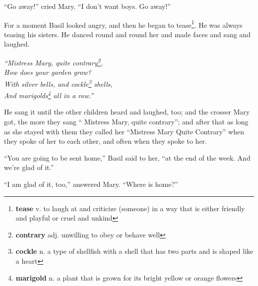 ``Go away!'' cried Mary. ``I don't want boys. Go away!''

For a moment Basil looked angry, and then he began to tease\footnote{\textbf{tease} v. to laugh at and criticize (someone) in a way that is either friendly and playful or cruel and unkind}. He was always teasing his sisters. He danced round and round her and made faces and sang and laughed.

\begin{center}
\textit{
``Mistress Mary, quite contrary\footnote{\textbf{contrary} adj. unwilling to obey or behave well},\\
How does your garden grow?\\
With silver bells, and cockle\footnote{\textbf{cockle} n. a type of shellfish with a shell that has two parts and is shaped like a heart } shells,\\
And marigolds\footnote{\textbf{marigold} n. a plant that is grown for its bright yellow or orange flowers} all in a row.''
}
\end{center}

He sang it until the other children heard and laughed, too; and the crosser Mary got, the more they sang `` Mistress Mary, quite contrary''; and after that as long as she stayed with them they called her ``Mistress Mary Quite Contrary'' when they spoke of her to each other, and often when they spoke to her.

``You are going to be sent home,'' Basil said to her, ``at the end of the week. And we're glad of it.''

``I am glad of it, too,'' answered Mary. ``Where is home?''
